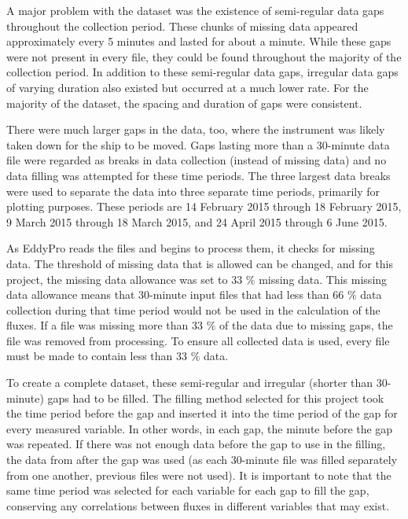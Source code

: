 A major problem with the dataset was the existence of semi-regular data gaps throughout the collection period. These chunks of missing data appeared approximately every 5 minutes and lasted for about a minute. While these gaps were not present in every file, they could be found throughout the majority of the collection period. In addition to these semi-regular data gaps, irregular data gaps of varying duration also existed but occurred at a much lower rate. For the majority of the dataset, the spacing and duration of gaps were consistent.

There were much larger gaps in the data, too, where the instrument was likely taken down for the ship to be moved. Gaps lasting more than a 30-minute data file were regarded as breaks in data collection (instead of missing data) and no data filling was attempted for these time periods. The three largest data breaks were used to separate the data into three separate time periods, primarily for plotting purposes. These periods are 14 February 2015 through 18 February 2015, 9 March 2015 through 18 March 2015, and 24 April 2015 through 6 June 2015.  

As EddyPro reads the files and begins to process them, it checks for missing data. The threshold of missing data that is allowed can be changed, and for this project, the missing data allowance was set to 33 $\%$ missing data. This missing data allowance means that 30-minute input files that had less than 66 $\%$ data collection during that time period would not be used in the calculation of the fluxes. If a file was missing more than 33 $\%$ of the data due to missing gaps, the file was removed from processing. To ensure all collected data is used, every file must be made to contain less than 33 $\%$ data. 
 
 To create a complete dataset, these semi-regular and irregular (shorter than 30-minute) gaps had to be filled. The filling method selected for this project took the time period before the gap and inserted it into the time period of the gap for every measured variable. In other words, in each gap, the minute before the gap was repeated. If there was not enough data before the gap to use in the filling, the data from after the gap was used (as each 30-minute file was filled separately from one another, previous files were not used). It is important to note that the same time period was selected for each variable for each gap to fill the gap, conserving any correlations between fluxes in different variables that may exist.  

